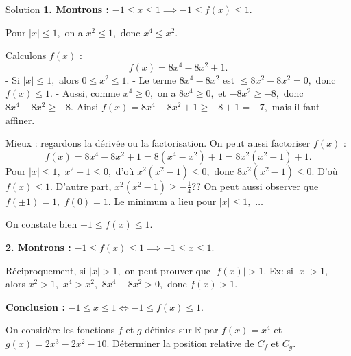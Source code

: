 \documentclass[a4paper,12pt]{article}
\begin{document}
\begin{solutionbox}{Solution}
\textbf{1. Montrons : } $-1 \le x \le 1 \implies -1 \le f(x) \le 1.$

Pour $|x|\le 1,$ on a $x^2 \le 1,$ donc $x^4 \le x^2.$

Calculons $f(x)$ :
$$
f(x) = 8x^4 - 8x^2 +1.
$$
- Si $|x|\le1,$ alors $0 \le x^2 \le 1.$
- Le terme $8x^4 -8x^2$ est $\le 8x^2 -8x^2 = 0,$ donc $f(x)\le 1.$
- Aussi, comme $x^4 \ge 0,$ on a $8x^4 \ge 0,$ et $-8x^2 \ge -8,$ donc $8x^4 -8x^2 \ge -8.$ Ainsi $f(x)= 8x^4 -8x^2 +1 \ge -8+1=-7,$ mais il faut affiner.

Mieux : regardons la dérivée ou la factorisation. On peut aussi factoriser $f(x)$ :
$$
f(x)=8x^4 -8x^2 +1=8(x^4 -x^2)+1=8x^2(x^2 -1)+1.
$$
Pour $|x|\le1,$ $x^2-1\le0,$ d’où $x^2(x^2-1)\le 0,$ donc $8x^2(x^2-1)\le0.$ D’où $f(x)\le1.$  
D'autre part, $x^2(x^2-1)\ge -\tfrac{1}{4}??$ On peut aussi observer que $f( \pm1)=1,$ $f(0)=1.$ Le minimum a lieu pour $|x|\le1,$ $\dots$

On constate bien $-1\le f(x)\le1$.

\textbf{2. Montrons : } $-1 \le f(x) \le 1 \implies -1 \le x \le 1.$

Réciproquement, si $|x|>1,$ on peut prouver que $|f(x)|>1.$  
Ex: si $|x|>1,$ alors $x^2>1,$ $x^4>x^2,$ $8x^4-8x^2>0,$ donc $f(x)>1.$

\textbf{Conclusion :}  
$\boxed{-1\le x\le1 \iff -1\le f(x)\le1.}$
\end{solutionbox}

\begin{exercice}[title=Exercice 22 $\quad \star \star \quad$ {[Représenter]}]
On considère les fonctions $f$ et $g$ définies sur $\mathbb{R}$ par $f(x)=x^4$ et $g(x)=2x^3 -2x^2 -10.$ Déterminer la position relative de $C_f$ et $C_g.$
\end{exercice}
\end{document}
